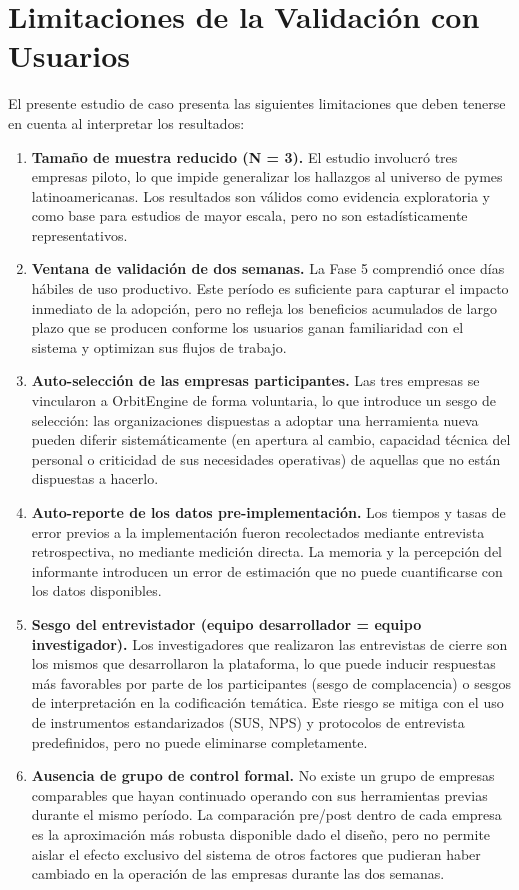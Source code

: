 \section{Limitaciones de la Validación con Usuarios}\label{limitaciones-de-la-validaciuxf3n-con-usuarios}

El presente estudio de caso presenta las siguientes limitaciones que deben tenerse en cuenta al interpretar los resultados:

\begin{enumerate}
\def\labelenumi{\arabic{enumi}.}
\item
  \textbf{Tamaño de muestra reducido (N = 3).} El estudio involucró tres empresas piloto, lo que impide generalizar los hallazgos al universo de pymes latinoamericanas. Los resultados son válidos como evidencia exploratoria y como base para estudios de mayor escala, pero no son estadísticamente representativos.
\item
  \textbf{Ventana de validación de dos semanas.} La Fase 5 comprendió once días hábiles de uso productivo. Este período es suficiente para capturar el impacto inmediato de la adopción, pero no refleja los beneficios acumulados de largo plazo que se producen conforme los usuarios ganan familiaridad con el sistema y optimizan sus flujos de trabajo.
\item
  \textbf{Auto-selección de las empresas participantes.} Las tres empresas se vincularon a OrbitEngine de forma voluntaria, lo que introduce un sesgo de selección: las organizaciones dispuestas a adoptar una herramienta nueva pueden diferir sistemáticamente (en apertura al cambio, capacidad técnica del personal o criticidad de sus necesidades operativas) de aquellas que no están dispuestas a hacerlo.
\item
  \textbf{Auto-reporte de los datos pre-implementación.} Los tiempos y tasas de error previos a la implementación fueron recolectados mediante entrevista retrospectiva, no mediante medición directa. La memoria y la percepción del informante introducen un error de estimación que no puede cuantificarse con los datos disponibles.
\item
  \textbf{Sesgo del entrevistador (equipo desarrollador = equipo investigador).} Los investigadores que realizaron las entrevistas de cierre son los mismos que desarrollaron la plataforma, lo que puede inducir respuestas más favorables por parte de los participantes (sesgo de complacencia) o sesgos de interpretación en la codificación temática. Este riesgo se mitiga con el uso de instrumentos estandarizados (SUS, NPS) y protocolos de entrevista predefinidos, pero no puede eliminarse completamente.
\item
  \textbf{Ausencia de grupo de control formal.} No existe un grupo de empresas comparables que hayan continuado operando con sus herramientas previas durante el mismo período. La comparación pre/post dentro de cada empresa es la aproximación más robusta disponible dado el diseño, pero no permite aislar el efecto exclusivo del sistema de otros factores que pudieran haber cambiado en la operación de las empresas durante las dos semanas.
\end{enumerate}
